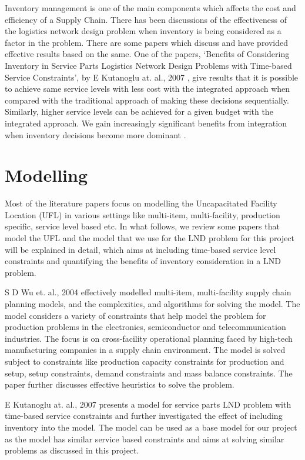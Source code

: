 \documentclass[12pt]{article}
\numberwithin{equation}{section}
\begin{document}
Inventory management is one of the main components which affects the cost and efficiency of a Supply Chain. There has been discussions of the effectiveness of the logistics network design problem when inventory is being considered as a factor in the problem. There are some papers which discuss and have provided effective results based on the same. One of the papers, ‘Benefits of Considering Inventory in Service Parts Logistics Network Design Problems with Time-based Service Constraints’, by E Kutanoglu at. al., 2007 \cite{EK}, give results that it is possible to achieve same service levels with less cost with the integrated approach when compared with the traditional approach of making these decisions sequentially. Similarly, higher service levels can be achieved for a given budget with the integrated approach. We gain increasingly significant benefits from integration when inventory decisions become more dominant \cite{EK}.


\section{Modelling}
Most of the literature papers focus on modelling the Uncapacitated Facility Location (UFL) in various settings like multi-item, multi-facility, production specific, service level based etc. In what follows, we review some papers that model the UFL and the model that we use for the LND problem for this project will be explained in detail, which aims at including time-based service level constraints and quantifying the benefits of inventory consideration in a LND problem. 

S D Wu et. al., 2004 \cite{SD} effectively modelled multi-item, multi-facility supply chain planning models, and the complexities, and algorithms for solving the model. The model considers a variety of constraints that help model the problem for production problems in the electronics, semiconductor and telecommunication industries. The focus is on cross-facility operational planning faced by high-tech manufacturing companies in a supply chain environment. The model is solved subject to constraints like production capacity constraints for production and setup, setup constraints, demand constraints and mass balance constraints. The paper further discusses effective heuristics to solve the problem.

E Kutanoglu at. al., 2007 \cite{EK} presents a model for service parts LND problem with time-based service constraints and further investigated the effect of including inventory into the model. The model can be used as a base model for our project as the model has similar service based constraints and aims at solving similar problems as discussed in this project. 
\end{document}
